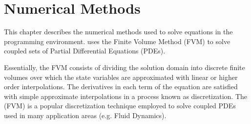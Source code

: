 \chapter{Numerical Methods}

This chapter describes the numerical methods used to solve equations
in the \FiPy{} programming environment. \FiPy{} uses the Finite Volume
Method (FVM) to solve coupled sets of Partial Differential Equations
(PDEs).

Essentially, the FVM consists of dividing the solution domain into
discrete finite volumes over which the state variables are
approximated with linear or higher order interpolations. The
derivatives in each term of the equation are satisfied with simple
approximate interpolations in a process known as discretization. The
(FVM) is a popular discretization technique employed to solve coupled
PDEs used in many application areas (e.g. Fluid Dynamics).






